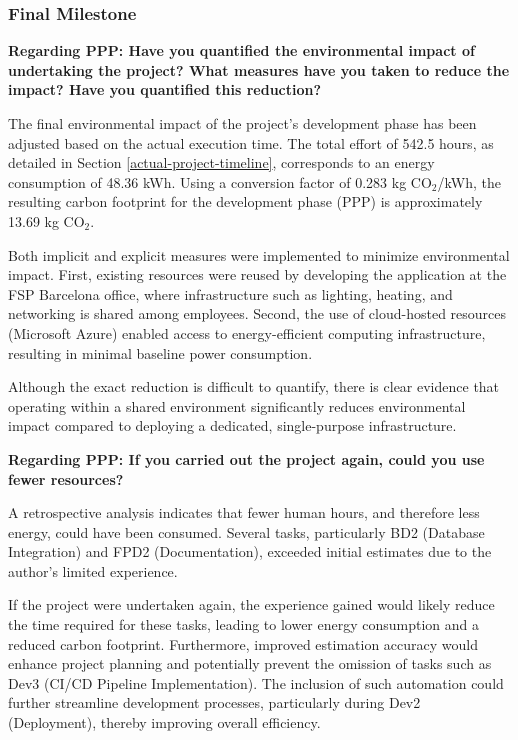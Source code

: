 \subsubsection{Final Milestone}

\textbf{Regarding PPP: Have you quantified the environmental impact of undertaking the project? What measures have you taken to reduce the impact? Have you quantified this reduction?}

The final environmental impact of the project's development phase has been adjusted based on the actual execution time. The total effort of 542.5 hours, as detailed in Section \ref{actual-project-timeline}, corresponds to an energy consumption of 48.36 kWh. Using a conversion factor of 0.283 kg CO$_2$/kWh, the resulting carbon footprint for the development phase (PPP) is approximately 13.69 kg CO$_2$.

Both implicit and explicit measures were implemented to minimize environmental impact. First, existing resources were reused by developing the application at the FSP Barcelona office, where infrastructure such as lighting, heating, and networking is shared among employees. Second, the use of cloud-hosted resources (Microsoft Azure) enabled access to energy-efficient computing infrastructure, resulting in minimal baseline power consumption.

Although the exact reduction is difficult to quantify, there is clear evidence that operating within a shared environment significantly reduces environmental impact compared to deploying a dedicated, single-purpose infrastructure.

\textbf{Regarding PPP: If you carried out the project again, could you use fewer resources?}

A retrospective analysis indicates that fewer human hours, and therefore less energy, could have been consumed. Several tasks, particularly BD2 (Database Integration) and FPD2 (Documentation), exceeded initial estimates due to the author's limited experience.

\newpage

If the project were undertaken again, the experience gained would likely reduce the time required for these tasks, leading to lower energy consumption and a reduced carbon footprint. Furthermore, improved estimation accuracy would enhance project planning and potentially prevent the omission of tasks such as Dev3 (CI/CD Pipeline Implementation). The inclusion of such automation could further streamline development processes, particularly during Dev2 (Deployment), thereby improving overall efficiency.

